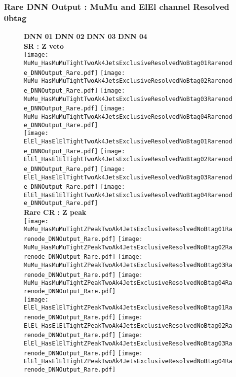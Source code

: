 \documentclass[9pt]{beamer}
\begin{document}
\begin{frame}
	\frametitle{Rare DNN Output : MuMu and ElEl channel Resolved 0btag}
	\begin{figure}
	    \textbf{DNN 01} \hspace{1.2cm} \textbf{DNN 02} \hspace{1.2cm} \textbf{DNN 03} \hspace{1.2cm} \textbf{DNN 04} \\
        \centering
        \textbf{SR : Z veto} \\
		\texttt{[image: MuMu\_HasMuMuTightTwoAk4JetsExclusiveResolvedNoBtag01Rarenode\_DNNOutput\_Rare.pdf]}
		\texttt{[image: MuMu\_HasMuMuTightTwoAk4JetsExclusiveResolvedNoBtag02Rarenode\_DNNOutput\_Rare.pdf]}
		\texttt{[image: MuMu\_HasMuMuTightTwoAk4JetsExclusiveResolvedNoBtag03Rarenode\_DNNOutput\_Rare.pdf]}
		\texttt{[image: MuMu\_HasMuMuTightTwoAk4JetsExclusiveResolvedNoBtag04Rarenode\_DNNOutput\_Rare.pdf]}\\
		\texttt{[image: ElEl\_HasElElTightTwoAk4JetsExclusiveResolvedNoBtag01Rarenode\_DNNOutput\_Rare.pdf]}
		\texttt{[image: ElEl\_HasElElTightTwoAk4JetsExclusiveResolvedNoBtag02Rarenode\_DNNOutput\_Rare.pdf]}
		\texttt{[image: ElEl\_HasElElTightTwoAk4JetsExclusiveResolvedNoBtag03Rarenode\_DNNOutput\_Rare.pdf]}
		\texttt{[image: ElEl\_HasElElTightTwoAk4JetsExclusiveResolvedNoBtag04Rarenode\_DNNOutput\_Rare.pdf]}\\
        \textbf{Rare CR : Z peak} \\
		\texttt{[image: MuMu\_HasMuMuTightZPeakTwoAk4JetsExclusiveResolvedNoBtag01Rarenode\_DNNOutput\_Rare.pdf]}
		\texttt{[image: MuMu\_HasMuMuTightZPeakTwoAk4JetsExclusiveResolvedNoBtag02Rarenode\_DNNOutput\_Rare.pdf]}
		\texttt{[image: MuMu\_HasMuMuTightZPeakTwoAk4JetsExclusiveResolvedNoBtag03Rarenode\_DNNOutput\_Rare.pdf]}
		\texttt{[image: MuMu\_HasMuMuTightZPeakTwoAk4JetsExclusiveResolvedNoBtag04Rarenode\_DNNOutput\_Rare.pdf]}\\
		\texttt{[image: ElEl\_HasElElTightZPeakTwoAk4JetsExclusiveResolvedNoBtag01Rarenode\_DNNOutput\_Rare.pdf]}
		\texttt{[image: ElEl\_HasElElTightZPeakTwoAk4JetsExclusiveResolvedNoBtag02Rarenode\_DNNOutput\_Rare.pdf]}
		\texttt{[image: ElEl\_HasElElTightZPeakTwoAk4JetsExclusiveResolvedNoBtag03Rarenode\_DNNOutput\_Rare.pdf]}
		\texttt{[image: ElEl\_HasElElTightZPeakTwoAk4JetsExclusiveResolvedNoBtag04Rarenode\_DNNOutput\_Rare.pdf]}\\
	\end{figure}
\end{frame}
\end{document}
